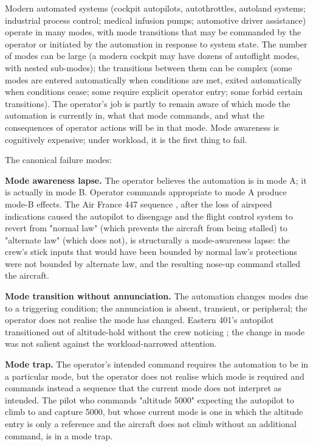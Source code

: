 Modern automated systems (cockpit autopilots, autothrottles, autoland systems; industrial process control; medical infusion pumps; automotive driver assistance) operate in many modes, with mode transitions that may be commanded by the operator or initiated by the automation in response to system state. The number of modes can be large (a modern cockpit may have dozens of autoflight modes, with nested sub-modes); the transitions between them can be complex (some modes are entered automatically when conditions are met, exited automatically when conditions cease; some require explicit operator entry; some forbid certain transitions). The operator's job is partly to remain aware of which mode the automation is currently in, what that mode commands, and what the consequences of operator actions will be in that mode. Mode awareness is cognitively expensive; under workload, it is the first thing to fail.

The canonical failure modes:

\textbf{Mode awareness lapse.} The operator believes the automation is in mode A; it is actually in mode B. Operator commands appropriate to mode A produce mode-B effects. The Air France 447 sequence \cite{acc:bea-af447}, after the loss of airspeed indications caused the autopilot to disengage and the flight control system to revert from "normal law" (which prevents the aircraft from being stalled) to "alternate law" (which does not), is structurally a mode-awareness lapse: the crew's stick inputs that would have been bounded by normal law's protections were not bounded by alternate law, and the resulting nose-up command stalled the aircraft.

\textbf{Mode transition without annunciation.} The automation changes modes due to a triggering condition; the annunciation is absent, transient, or peripheral; the operator does not realise the mode has changed. Eastern 401's autopilot transitioned out of altitude-hold without the crew noticing \cite{acc:ntsb-aar73-14}; the change in mode was not salient against the workload-narrowed attention.

\textbf{Mode trap.} The operator's intended command requires the automation to be in a particular mode, but the operator does not realise which mode is required and commands instead a sequence that the current mode does not interpret as intended. The pilot who commands "altitude 5000" expecting the autopilot to climb to and capture 5000, but whose current mode is one in which the altitude entry is only a reference and the aircraft does not climb without an additional command, is in a mode trap.

